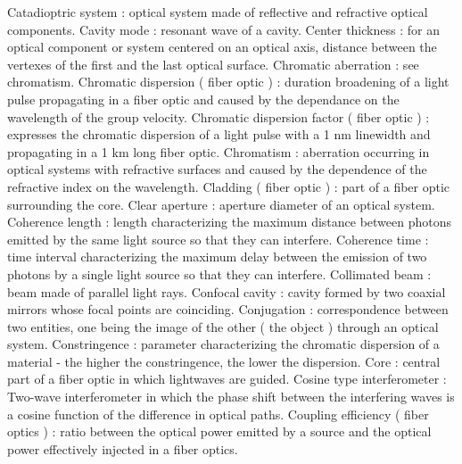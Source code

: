 Catadioptric system                                  : optical system made of reflective and refractive optical components.
Cavity mode                                          : resonant wave of a cavity.
Center thickness                                     : for an optical component or system centered on an optical axis, distance between the vertexes of the first and the last optical surface.
Chromatic aberration                                 : see chromatism.
Chromatic dispersion ( fiber optic )                 : duration broadening of a light pulse propagating in a fiber optic and caused by the dependance on the wavelength of the group velocity.
Chromatic dispersion factor ( fiber optic )          : expresses the chromatic dispersion of a light pulse with a 1 nm linewidth and propagating in a 1 km long fiber optic.
Chromatism                                           : aberration occurring in optical systems with refractive surfaces and caused by the dependence of the refractive index on the wavelength.
Cladding ( fiber optic )                             : part of a fiber optic surrounding the core.
Clear aperture                                       : aperture diameter of an optical system.
Coherence length                                     : length characterizing the maximum distance between photons emitted by the same light source so that they can interfere.
Coherence time                                       : time interval characterizing the maximum delay between the emission of two photons by a single light source so that they can interfere.
Collimated beam                                      : beam made of parallel light rays.
Confocal cavity                                      : cavity formed by two coaxial mirrors whose focal points are coinciding.
Conjugation                                          : correspondence between two entities, one being the image of the other ( the object ) through an optical system.
Constringence                                        : parameter characterizing the chromatic dispersion of a material - the higher the constringence, the lower the dispersion.
Core                                                 : central part of a fiber optic in which lightwaves are guided.
Cosine type interferometer                           : Two-wave interferometer in which the phase shift between the interfering waves is a cosine function of the difference in optical paths.
Coupling efficiency ( fiber optics )                 : ratio between the optical power emitted by a source and the optical power effectively injected in a fiber optics.
